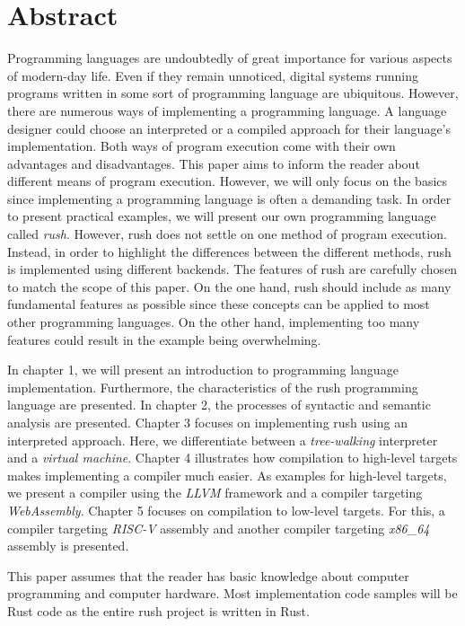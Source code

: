 \chapter*{Abstract}

Programming languages are undoubtedly of great importance for various aspects of
modern-day life. Even if they remain unnoticed, digital systems running programs
written in some sort of programming language are ubiquitous.
However, there are numerous ways of implementing a programming language. A
language designer could choose an interpreted or a compiled approach for their
language's implementation. Both ways of program execution come with their own
advantages and disadvantages.
\newline
This paper aims to inform the reader about different means of program execution.
However, we will only focus on the basics since implementing a programming language is often a demanding task.
In order to present practical examples, we will present our own programming language called \emph{rush}.
However, rush does not settle on one method of program execution. Instead, in
order to highlight the differences between the different methods, rush is implemented using different backends.
The features of rush are carefully chosen to match the scope of this paper.
On the one hand, rush should include as many fundamental features as possible since these concepts can be applied to most other programming languages.
On the other hand, implementing too many features could result in the example being overwhelming.

In chapter 1, we will present an introduction to programming language implementation.
Furthermore, the characteristics of the rush programming language are presented.
In chapter 2, the processes of syntactic and semantic analysis are presented.
Chapter 3 focuses on implementing rush using an interpreted approach.
Here, we differentiate between a \emph{tree-walking} interpreter and a \emph{virtual machine}.
Chapter 4 illustrates how compilation to high-level targets makes implementing a compiler much easier.
As examples for high-level targets, we present a compiler using the \emph{LLVM} framework and a
compiler targeting \emph{WebAssembly}.
Chapter 5 focuses on compilation to low-level targets.
For this, a compiler targeting \emph{RISC-V} assembly and another compiler targeting \emph{x86\_64} assembly is presented.

This paper assumes that the reader has basic knowledge about computer programming and computer hardware.
Most implementation code samples will be Rust code as the entire rush project is written in Rust.
